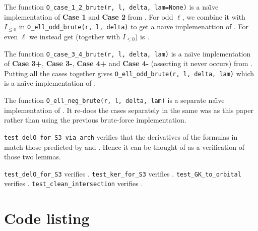 \begin{enumerate}
\begin{itemize}
      \ii The function \texttt{O\_case\_1\_2\_brute(r, l, delta, lam=None)}
      is a na\"{\i}ve implementation of \textbf{Case 1} and \textbf{Case 2}
      from .
      For odd $\ell$, we combine it with $I_{\le 0}$ in \texttt{O\_ell\_odd\_brute(r, l, delta)}
      to get a na\"{\i}ve implemenattion of .
      For even $\ell$ we instead get (together with $I_{\le 0}$) is .

      \ii The function \texttt{O\_case\_3\_4\_brute(r, l, delta, lam)}
      is a na\"{\i}ve implementation of
      \textbf{Case 3\ts+}, \textbf{Case 3\ts-}, \textbf{Case 4\ts+}
      and \textbf{Case 4\ts-} (asserting it never occurs)
      from .
      Putting all the cases together gives
      \texttt{O\_ell\_odd\_brute(r, l, delta, lam)}
      which is a na\"{\i}ve implementation of .

      \ii The function \texttt{O\_ell\_neg\_brute(r, l, delta, lam)}
      is a separate na\"{\i}ve implementation of .
      It re-does the cases separately in the same was as this paper
      rather than using the previous brute-force implementation.
    \end{itemize}

  \ii \texttt{test\_delO\_for\_S3\_via\_arch} verifies that the derivatives of the formulas in
  match those predicted by  and .
  Hence it can be thought of as a verification of those two lemmas.

  \ii \texttt{test\_delO\_for\_S3} verifies .
  \ii \texttt{test\_ker\_for\_S3} verifies .
  \ii \texttt{test\_GK\_to\_orbital} verifies .
  \ii \texttt{test\_clean\_intersection} verifies .
\end{enumerate}

\section{Code listing}
\singlespacing

